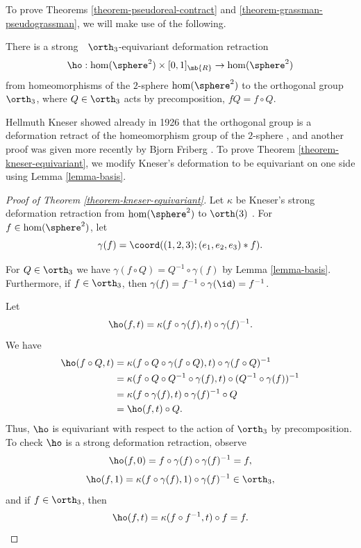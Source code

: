 To prove Theorems \ref{theorem-pseudoreal-contract} and \ref{theorem-grassman-pseudograssman}, we will make use of the following.

\begin{theorem}\label{theorem-kneser-equivariant}
There is a strong\ ~$\orth_3$-equivariant deformation retraction
\[\ho : \hom(\sphere^2) \times [0,1]_\mb{R} \to \hom(\sphere^2)\]
from homeomorphisms of the $2$-sphere $\hom(\sphere^2)$ to the orthogonal group $\orth_3$,
where $Q \in \orth_3$ acts by precomposition, \ie $fQ = f \circ Q$.
\end{theorem}

Hellmuth Kneser showed already in 1926 that the orthogonal group is a deformation retract of the homeomorphism group of the $2$-sphere \cite{kneser1926deformationssatze}, and another proof was given more recently by Bjorn Friberg \cite{friberg1973topological}.
To prove Theorem \ref{theorem-kneser-equivariant}, we modify Kneser's deformation to be equivariant on one side using Lemma \ref{lemma-basis}.

\begin{proof}[Proof of Theorem \ref{theorem-kneser-equivariant}]
Let $\kappa$ be Kneser's strong deformation retraction from $\hom(\sphere^2)$ to $\orth(3)$ \cite{kneser1926deformationssatze}.
For $f \in \hom(\sphere^2)$, let
\[ \gamma(f) = \coord((1,2,3);(e_1,e_2,e_3)*f). \]

For $Q \in \orth_3$ we have $\gamma(f\circ Q) = Q^{-1} \circ \gamma(f)$ by Lemma \ref{lemma-basis}. Furthermore, if $f \in \orth_3$, then $\gamma(f) = f^{-1} \circ \gamma(\id) = f^{-1}$.

Let
\[ \ho(f,t) = \kappa(f \circ \gamma(f),t) \circ \gamma(f)^{-1}. \]
We have
\begin{align*}
\ho(f \circ Q,t)
&= \kappa(f \circ Q \circ \gamma(f \circ Q),t) \circ \gamma(f \circ Q)^{-1} \\
&= \kappa(f \circ Q \circ Q^{-1} \circ \gamma(f),t) \circ (Q^{-1} \circ \gamma(f))^{-1} \\
&= \kappa(f \circ \gamma(f),t) \circ \gamma(f)^{-1} \circ Q \\
&= \ho(f ,t) \circ Q.
\end{align*}
Thus, $\ho$ is equivariant with respect to the action of $\orth_3$ by precomposition.
To check $\ho$ is a strong deformation retraction, observe
\[\ho(f,0) = f \circ \gamma(f) \circ \gamma(f)^{-1} = f, \]
\[\ho(f,1) = \kappa(f \circ \gamma(f),1) \circ \gamma(f)^{-1} \in \orth_3, \]
and if $f \in \orth_3$, then
\[\ho(f,t) = \kappa(f \circ f^{-1},t) \circ f = f. \qedhere \]
\end{proof}

